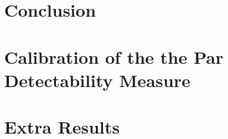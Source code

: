 \documentclass[10pt,twoside,openright,titlepage]{ce}
\begin{document}
\chapter{Conclusion}




\appendix
\chapter{Calibration of the the Par Detectability Measure}
\label{ch:perceptual:implementation:calibration}

\newpage
\chapter{Extra Results}

\newpage
\end{document}
